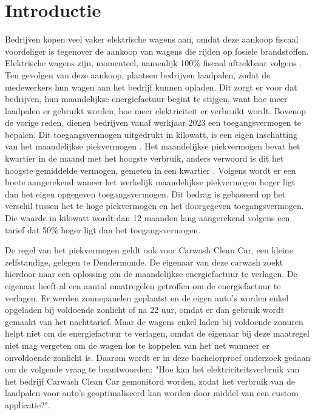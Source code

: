 
\section{Introductie}%
\label{sec:introductie}

Bedrijven kopen veel vaker elektrische wagens aan, omdat deze aankoop fiscaal voordeliger is tegenover de aankoop van wagens die rijden op fosiele brandstoffen. Elektrische wagens zijn, momenteel, namenlijk 100\% fiscaal aftrekbaar volgens \textcite{Blomme2023}. Ten gevolgen van deze aankoop, plaatsen bedrijven laadpalen, zodat de medewerkers hun wagen aan het bedrijf kunnen opladen. Dit zorgt er voor dat bedrijven, hun maandelijkse energiefactuur begint te stijgen, want hoe meer laadpalen er gebruikt worden, hoe meer elektriciteit er verbruikt wordt. Bovenop de vorige reden, dienen bedrijven vanaf werkjaar 2023 een toegangsvermogen te bepalen. Dit toegangsvermogen uitgedrukt in kilowatt, is een eigen inschatting van het maandelijkse piekvermogen \autocite{Fluvius2022}. Het maandelijkse piekvermogen bevat het kwartier in de maand met het hoogste verbruik, anders verwoord is dit het hoogste gemiddelde vermogen, gemeten in een kwartier \autocite{Fluvius2022}. Volgens \textcite{Fluvius2022} wordt er een boete aangerekend waneer het werkelijk maandelijkse piekvermogen hoger ligt dan het eigen opgegeven toegangsvermogen. Dit bedrag is gebaseerd op het verschil tussen het te hoge piekvermogen en het doorgegeven toegangsvermogen. Die waarde in kilowatt wordt dan 12 maanden lang aangerekend volgens een tarief dat 50\% hoger ligt dan het toegangsvermogen.

De regel van het piekvermogen geldt ook voor Carwash Clean Car, een kleine zelfstandige, gelegen te Dendermonde. De eigenaar van deze carwash zoekt hierdoor naar een oplossing om de maandelijkse energiefactuur te verlagen. De eigenaar heeft al een aantal maatregelen getroffen om de energiefactuur te verlagen. Er werden zonnepanelen geplaatst en de eigen auto's worden enkel opgeladen bij voldoende zonlicht of na 22 uur, omdat er dan gebruik wordt gemaakt van het nachttarief. Maar de wagens enkel laden bij voldoende zonuren helpt niet om de energiefactuur te verlagen, omdat de eigenaar bij deze maatregel niet mag vergeten om de wagen los te koppelen van het net wanneer er onvoldoende zonlicht is. Daarom wordt er in deze bachelorproef onderzoek gedaan om de volgende vraag te beantwoorden: "Hoe kan het elektriciteitsverbruik van het bedrijf Carwash Clean Car gemonitord worden, zodat het verbruik van de laadpalen voor auto's geoptimaliseerd kan worden door middel van een custom applicatie?".

